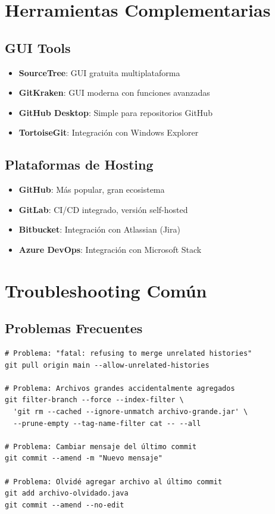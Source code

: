 \documentclass[12pt,a4paper]{article}
\begin{document}
\section{Herramientas Complementarias}

\subsection{GUI Tools}
\begin{itemize}
    \item \textbf{SourceTree}: GUI gratuita multiplataforma
    \item \textbf{GitKraken}: GUI moderna con funciones avanzadas
    \item \textbf{GitHub Desktop}: Simple para repositorios GitHub
    \item \textbf{TortoiseGit}: Integración con Windows Explorer
\end{itemize}

\subsection{Plataformas de Hosting}
\begin{itemize}
    \item \textbf{GitHub}: Más popular, gran ecosistema
    \item \textbf{GitLab}: CI/CD integrado, versión self-hosted
    \item \textbf{Bitbucket}: Integración con Atlassian (Jira)
    \item \textbf{Azure DevOps}: Integración con Microsoft Stack
\end{itemize}

\section{Troubleshooting Común}

\subsection{Problemas Frecuentes}
\begin{lstlisting}[caption=Soluciones a problemas comunes]
# Problema: "fatal: refusing to merge unrelated histories"
git pull origin main --allow-unrelated-histories

# Problema: Archivos grandes accidentalmente agregados
git filter-branch --force --index-filter \
  'git rm --cached --ignore-unmatch archivo-grande.jar' \
  --prune-empty --tag-name-filter cat -- --all

# Problema: Cambiar mensaje del último commit
git commit --amend -m "Nuevo mensaje"

# Problema: Olvidé agregar archivo al último commit
git add archivo-olvidado.java
git commit --amend --no-edit
\end{lstlisting}
\end{document}
